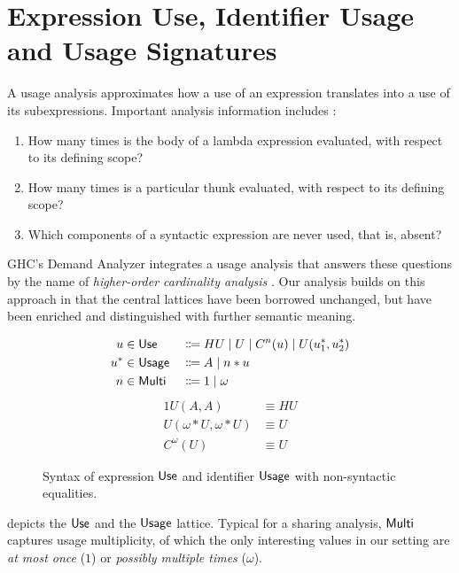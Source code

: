 \section{Expression Use, Identifier Usage and Usage Signatures}

A usage analysis approximates how a use of an expression translates into a use of its subexpressions. Important analysis information includes \parencite{card}:

\begin{enumerate}
\item How many times is the body of a lambda expression evaluated, with respect to its defining scope?
\item How many times is a particular thunk evaluated, with respect to its defining scope?
\item Which components of a syntactic expression are never used, that is, absent?
\end{enumerate}

GHC's Demand Analyzer integrates a usage analysis that answers these questions by the name of \emph{higher-order cardinality analysis} \parencite{card}. 
Our analysis builds on this approach in that the central lattices have been borrowed unchanged, but have been enriched and distinguished with further semantic meaning.

\begin{figure}
\begin{alignat*}{2}
u   &\in \text{\textsf{Use}}   &{} \Coloneqq {}& HU \mid U \mid C^n(u) \mid U(u^*_1, u^*_2) \\
u^* &\in \text{\textsf{Usage}} &{} \Coloneqq {}& A \mid n*u \\
n   &\in \text{\textsf{Multi}} &{} \Coloneqq {}& 1 \mid \omega
\end{alignat*}
\begin{alignat*}{1}
U(A,A)               &\equiv HU \\
U(\omega*U,\omega*U) &\equiv U \\
C^\omega(U)          &\equiv U
\end{alignat*}
\caption{Syntax of expression $\text{\textsf{Use}}$ and identifier $\text{\textsf{Usage}}$ with non-syntactic equalities.}
\label{fig:usg}
\end{figure}


 depicts the $\text{\textsf{Use}}$ and the $\text{\textsf{Usage}}$ lattice. 
Typical for a sharing analysis, $\text{\textsf{Multi}}$ captures usage multiplicity, of which the only interesting values in our setting are \emph{at most once} ($1$) or \emph{possibly multiple times} ($\omega$).

